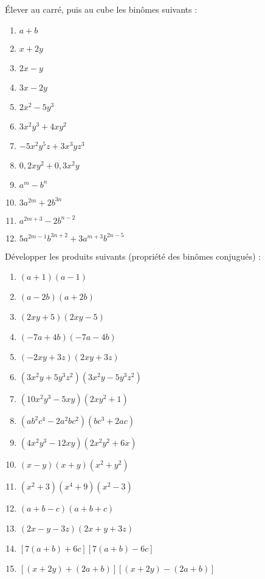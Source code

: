  
\begin{exercice}\'Elever au carré, puis au cube les binômes suivants :
\begin{multicols}{2}
\begin{enumerate}
\item $a+b$	
\item $x+2y$	
\item $2x-y$	
\item $3x-2y$	
\item $2{{x}^{2}}-5{{y}^{3}}$	
\item $3{{x}^{2}}{{y}^{3}}+4x{{y}^{2}}$	
\item $-5{{x}^{2}}{{y}^{5}}z+3{{x}^{3}}y{{z}^{3}}$	
\item $0,2x{{y}^{2}}+0,3{{x}^{2}}y$	
\item ${{a}^{m}}-{{b}^{n}}$
\item $3{{a}^{2m}}+2{{b}^{3n}}$
\item ${{a}^{2m+3}}-2{{b}^{n-2}}$	
\item $5{{a}^{2m-1}}{{b}^{3n+2}}+3{{a}^{m+3}}{{b}^{2n-5}}$
\end{enumerate}
\end{multicols}
\end{exercice}

\begin{exercice}Développer les produits suivants (propriété des binômes conjugués) :
\begin{enumerate}
\item $\left( a+1 \right)\left( a-1 \right)$	
\item $\left( a-2b \right)\left( a+2b \right)$	
\item $\left( 2xy+5 \right)\left( 2xy-5 \right)$	
\item $\left( -7a+4b \right)\left( -7a-4b \right)$	
\item $\left( -2xy+3z \right)\left( 2xy+3z \right)$	
\item $\left( 3{{x}^{2}}y+5{{y}^{3}}{{z}^{2}} \right)\left( 3{{x}^{2}}y-5{{y}^{3}}{{z}^{2}} \right)$	
\item $\left( 10{{x}^{2}}{{y}^{3}}-5xy \right)\left( 2x{{y}^{2}}+1 \right)$	
\item $\left( a{{b}^{2}}{{c}^{4}}-2{{a}^{2}}b{{c}^{2}} \right)\left( b{{c}^{3}}+2ac \right)$
\item $\left( 4{{x}^{2}}{{y}^{3}}-12xy \right)\left( 2{{x}^{2}}{{y}^{2}}+6x \right)$ 
\item $\left( x-y \right)\left( x+y \right)\left( {{x}^{2}}+{{y}^{2}} \right)$
\item $\left( {{x}^{2}}+3 \right)\left( {{x}^{4}}+9 \right)\left( {{x}^{2}}-3 \right)$
\item $\left( a+b-c \right)\left( a+b+c \right)$  
\item $\left( 2x-y-3z \right)\left( 2x+y+3z \right)$
\item $\left[ 7\left( a+b \right)+6c \right]\left[ 7\left( a+b \right)-6c \right]$
\item $\left[ \left( x+2y \right)+\left( 2a+b \right) \right]\left[ \left( x+2y \right)-\left( 2a+b \right) \right]$
\end{enumerate}
\end{exercice}


